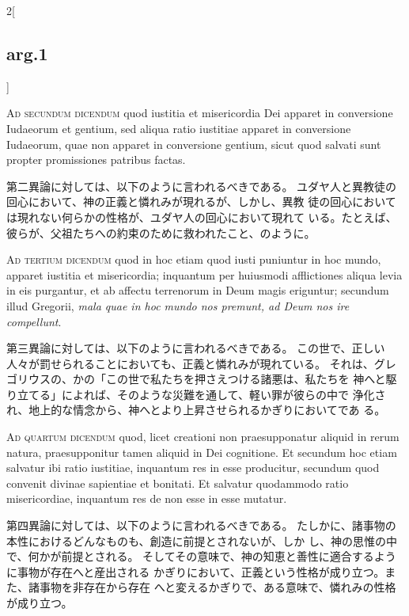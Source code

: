 \documentclass[paper=a4paper,fontsize=10pt,jafontsize=9pt,titlepage]{jlreq}
\begin{document}
\begin{paracol}{2}[\subsection{arg.1}]
\switchcolumn*[\subsection{ad.2}]

{\scshape Ad secundum dicendum} quod iustitia et
misericordia Dei apparet in conversione Iudaeorum et gentium, sed aliqua
ratio iustitiae apparet in conversione Iudaeorum, quae non apparet in
conversione gentium, sicut quod salvati sunt propter promissiones
patribus factas.

\switchcolumn

第二異論に対しては、以下のように言われるべきである。
ユダヤ人と異教徒の回心において、神の正義と憐れみが現れるが、しかし、異教
 徒の回心においては現れない何らかの性格が、ユダヤ人の回心において現れて
 いる。たとえば、彼らが、父祖たちへの約束のために救われたこと、のように。

\switchcolumn*[\subsection{ad.3}]

{\scshape Ad tertium dicendum} quod in hoc etiam quod
iusti puniuntur in hoc mundo, apparet iustitia et misericordia;
inquantum per huiusmodi afflictiones aliqua levia in eis purgantur, et
ab affectu terrenorum in Deum magis eriguntur; secundum illud Gregorii,
{\itshape mala quae in hoc mundo nos premunt, ad Deum nos ire compellunt}.

\switchcolumn

第三異論に対しては、以下のように言われるべきである。
この世で、正しい人々が罰せられることにおいても、正義と憐れみが現れている。
それは、グレゴリウスの、かの「この世で私たちを押さえつける諸悪は、私たちを
 神へと駆り立てる」によれば、そのような災難を通して、軽い罪が彼らの中で
 浄化され、地上的な情念から、神へとより上昇させられるかぎりにおいてであ
 る。

\switchcolumn*[\subsection{ad.4}]

{\scshape Ad quartum dicendum} quod, licet creationi non
praesupponatur aliquid in rerum natura, praesupponitur tamen aliquid in
Dei cognitione. Et secundum hoc etiam salvatur ibi ratio iustitiae,
inquantum res in esse producitur, secundum quod convenit divinae
sapientiae et bonitati. Et salvatur quodammodo ratio misericordiae,
inquantum res de non esse in esse mutatur.

\switchcolumn

第四異論に対しては、以下のように言われるべきである。
たしかに、諸事物の本性におけるどんなものも、創造に前提とされないが、しか
 し、神の思惟の中で、何かが前提とされる。
そしてその意味で、神の知恵と善性に適合するように事物が存在へと産出される
 かぎりにおいて、正義という性格が成り立つ。また、諸事物を非存在から存在
 へと変えるかぎりで、ある意味で、憐れみの性格が成り立つ。

\end{paracol}
\end{document}
